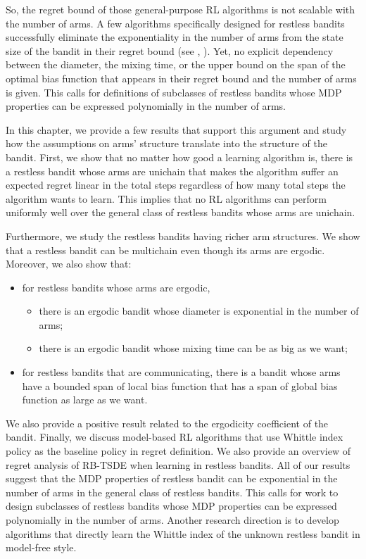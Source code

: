 So, the regret bound of those general-purpose RL algorithms is not scalable with the number of arms.
A few algorithms specifically designed for restless bandits successfully eliminate the exponentiality in the number of arms from the state size of the bandit in their regret bound (see \eg, \cite{ortner2012regret, jung2019thompson, akbarzadeh2022learning}).
Yet, no explicit dependency between the diameter, the mixing time, or the upper bound on the span of the optimal bias function that appears in their regret bound and the number of arms is given.
This calls for definitions of subclasses of restless bandits whose MDP properties can be expressed polynomially in the number of arms.

In this chapter, we provide a few results that support this argument and study how the assumptions on arms' structure translate into the structure of the bandit.
First, we show that no matter how good a learning algorithm is, there is a restless bandit whose arms are unichain that makes the algorithm suffer an expected regret linear in the total steps regardless of how many total steps the algorithm wants to learn.
This implies that no RL algorithms can perform uniformly well over the general class of restless bandits whose arms are unichain. 

Furthermore, we study the restless bandits having richer arm structures.
We show that a restless bandit can be multichain even though its arms are ergodic.
Moreover, we also show that:
\begin{itemize}
    \item for restless bandits whose arms are ergodic,
        \begin{itemize}
            \item there is an ergodic bandit whose diameter is exponential in the number of arms;
            \item there is an ergodic bandit whose mixing time can be as big as we want;
        \end{itemize}
    \item for restless bandits that are communicating, there is a bandit whose arms have a bounded span of local bias function that has a span of global bias function as large as we want.
\end{itemize}
We also provide a positive result related to the ergodicity coefficient of the bandit.
Finally, we discuss model-based RL algorithms that use Whittle index policy as the baseline policy in regret definition.
We also provide an overview of regret analysis of RB-TSDE \cite{akbarzadeh2022learning} when learning in restless bandits.
All of our results suggest that the MDP properties of restless bandit can be exponential in the number of arms in the general class of restless bandits.
This calls for work to design subclasses of restless bandits whose MDP properties can be expressed polynomially in the number of arms.
Another research direction is to develop algorithms that directly learn the Whittle index of the unknown restless bandit in model-free style.

